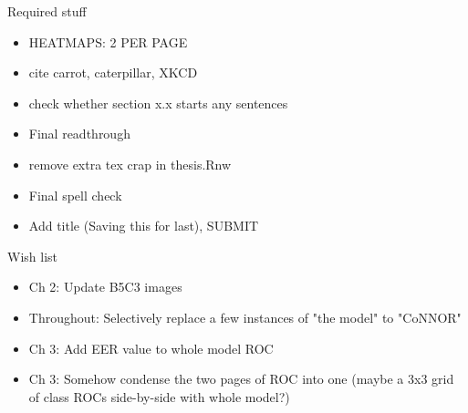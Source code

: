 
Required stuff

\begin{itemize}
\item HEATMAPS: 2 PER PAGE
\item cite carrot, caterpillar, XKCD
\item check whether section x.x starts any sentences
\item Final readthrough
\item remove extra tex crap in thesis.Rnw
\item Final spell check
\item Add title (Saving this for last), SUBMIT
\end{itemize}



Wish list

\begin{itemize}
\item Ch 2: Update B5C3 images
\item Throughout: Selectively replace a few instances of "the model" to "CoNNOR"
\item Ch 3: Add EER value to whole model ROC
\item Ch 3: Somehow condense the two pages of ROC into one (maybe a 3x3 grid of class ROCs side-by-side with whole model?)
\end{itemize}


